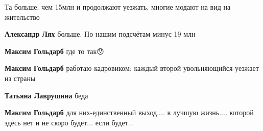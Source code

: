 \begin{itemize}
Та больше. чем 15млн и продолжают уезжать. многие модают на вид на жительство

\begin{itemize}
 
\textbf{Александр Лях} больше. По нашим подсчётам минус 19 млн

 
\textbf{Максим Гольдарб} где то так😯

 
\textbf{Максим Гольдарб} работаю кадровиком: каждый второй увольняющийся-уезжает из страны

 
\textbf{Татьяна Лаврушина} беда

 
\textbf{Максим Гольдарб} для них-единственный выход.... в лучшую жизнь.... которой здесь нет и не скоро будет... если будет...
\end{itemize}

 

\end{itemize}
